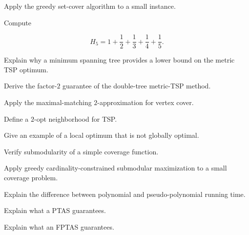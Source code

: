 \begin{exercise}[3]
Apply the greedy set-cover algorithm to a small instance.
\end{exercise}

\begin{exercise}[3]
Compute

\[
H_5
=
1+\frac12+\frac13+\frac14+\frac15.
\]
\end{exercise}

\begin{exercise}[3]
Explain why a minimum spanning tree provides a lower bound on the metric
TSP optimum.
\end{exercise}

\begin{exercise}[3]
Derive the factor-\(2\) guarantee of the double-tree metric-TSP method.
\end{exercise}

\begin{exercise}[3]
Apply the maximal-matching \(2\)-approximation for vertex cover.
\end{exercise}

\begin{exercise}[3]
Define a \(2\)-opt neighborhood for TSP.
\end{exercise}

\begin{exercise}[3]
Give an example of a local optimum that is not globally optimal.
\end{exercise}

\begin{exercise}[3]
Verify submodularity of a simple coverage function.
\end{exercise}

\begin{exercise}[3]
Apply greedy cardinality-constrained submodular maximization to a small
coverage problem.
\end{exercise}

\begin{exercise}[3]
Explain the difference between polynomial and pseudo-polynomial running
time.
\end{exercise}

\begin{exercise}[3]
Explain what a PTAS guarantees.
\end{exercise}

\begin{exercise}[3]
Explain what an FPTAS guarantees.
\end{exercise}

